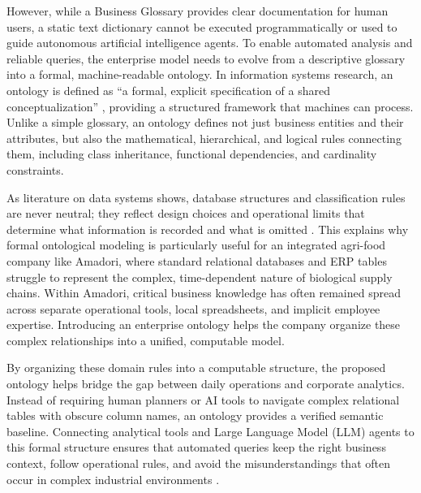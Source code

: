 However, while a Business Glossary provides clear documentation for human users, a static text dictionary cannot be executed programmatically or used to guide autonomous 
artificial intelligence agents. To enable automated analysis and reliable queries, the enterprise model needs to evolve from a descriptive glossary into a formal, 
machine-readable ontology. 
In information systems research, an ontology is defined as ``a formal, explicit specification of a shared conceptualization'' \cite{gruber1993translation, noy2001ontology}, 
providing a structured framework that machines can process. Unlike a simple glossary, an ontology defines not just business entities and their attributes, 
but also the mathematical, hierarchical, and logical rules connecting them, including class inheritance, functional dependencies, and cardinality constraints.

As literature on data systems shows, database structures and classification rules are never neutral; they reflect design choices and operational limits that determine 
what information is recorded and what is omitted \cite{bowker1999sorting, kitchin2014data}. 
This explains why formal ontological modeling is particularly useful for an integrated agri-food company like Amadori, where standard relational databases and ERP tables 
struggle to represent the complex, time-dependent nature of biological supply chains.
Within Amadori, critical business knowledge has often remained spread across separate operational tools, local spreadsheets, and implicit employee expertise. 
Introducing an enterprise ontology helps the company organize these complex relationships into a unified, computable model. 

By organizing these domain rules into a computable structure, the proposed ontology helps bridge the gap between daily operations and corporate analytics. 
Instead of requiring human planners or AI tools to navigate complex relational tables with obscure column names, an ontology provides a verified semantic baseline. 
Connecting analytical tools and Large Language Model (LLM) agents to this formal structure ensures that automated queries keep the right business context, 
follow operational rules, and avoid the misunderstandings that often occur in complex industrial environments \cite{bowker1999sorting, hilger2026bridging}.


